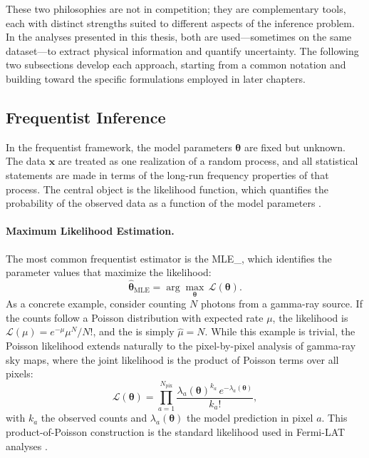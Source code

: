 These two philosophies are not in competition; they are complementary tools, each with distinct strengths suited to different aspects of the inference problem.
In the analyses presented in this thesis, both are used---sometimes on the same dataset---to extract physical information and quantify uncertainty.
The following two subsections develop each approach, starting from a common notation and building toward the specific formulations employed in later chapters.


\subsection{Frequentist Inference}
\label{sec:3.1.2}

In the frequentist framework, the model parameters $\boldsymbol{\theta}$ are fixed but unknown.
The data $\mathbf{x}$ are treated as one realization of a random process, and all statistical statements are made in terms of the long-run frequency properties of that process.
The central object is the likelihood function, which quantifies the probability of the observed data as a function of the model parameters \cite{Hastie:2009}.

\paragraph{Maximum Likelihood Estimation.}

The most common frequentist estimator is the \gls{MLE_}, which identifies the parameter values that maximize the likelihood:
\begin{equation}
	\hat{\boldsymbol{\theta}}_{\mathrm{MLE}} = \arg\max_{\boldsymbol{\theta}} \, \mathcal{L}(\boldsymbol{\theta}).
	\label{eq:mle}
\end{equation}
As a concrete example, consider counting $N$ photons from a gamma-ray source.
If the counts follow a Poisson distribution with expected rate $\mu$, the likelihood is $\mathcal{L}(\mu) = e^{-\mu} \mu^N / N!
$, and the \MLE is simply $\hat{\mu} = N$. While this example is trivial, the Poisson likelihood extends naturally to the pixel-by-pixel analysis of gamma-ray sky maps, where the joint likelihood is the product of Poisson terms over all pixels:
\begin{equation}
	\mathcal{L}(\boldsymbol{\theta}) = \prod_{a=1}^{N_{\mathrm{pix}}} \frac{\lambda_a(\boldsymbol{\theta})^{k_a} \, e^{-\lambda_a(\boldsymbol{\theta})}}{k_a!},
	\label{eq:poisson_likelihood}
\end{equation}
with $k_a$ the observed counts and $\lambda_a(\boldsymbol{\theta})$ the model prediction in pixel $a$.
This product-of-Poisson construction is the standard likelihood used in Fermi-LAT analyses \cite{Mattox:1996zz}.

